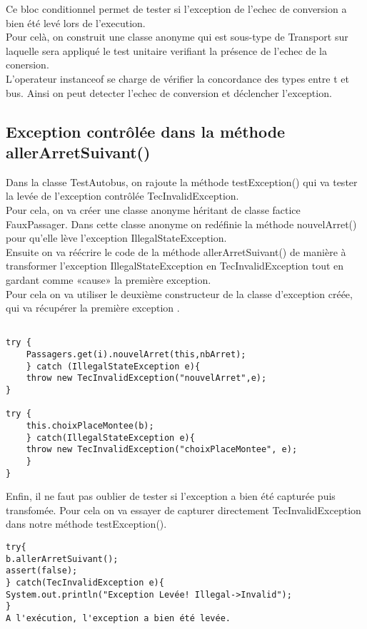 \documentclass[12pt,a4paper]{article}
\begin{document}
Ce bloc conditionnel permet de tester si l'exception de l'echec de conversion a bien été levé lors de l'execution.\\
Pour celà, on construit une classe anonyme qui est sous-type de Transport sur laquelle sera appliqué le test unitaire verifiant la présence de l'echec de la conersion.\\
L'operateur instanceof se charge de vérifier la concordance des types entre t et bus. Ainsi on peut detecter l'echec de conversion et déclencher l'exception.


\subsection{Exception contrôlée dans la méthode allerArretSuivant()} 

Dans la classe TestAutobus, on rajoute la méthode testException() qui va tester la levée de l’exception contrôlée TecInvalidException. \\
Pour cela, on va créer une classe anonyme héritant de classe factice FauxPassager. Dans cette classe anonyme on redéfinie la méthode nouvelArret() pour qu'elle lève l'exception IllegalStateException.\\
Ensuite on va réécrire le code de la méthode allerArretSuivant() de manière à transformer l’exception IllegalStateException en TecInvalidException tout en gardant comme «cause» la première exception.\\
Pour cela on va utiliser le deuxième constructeur de la classe d'exception créée, qui va récupérer la première exception .\\

\begin{verbatim}

try {
	Passagers.get(i).nouvelArret(this,nbArret);
	} catch (IllegalStateException e){
	throw new TecInvalidException("nouvelArret",e);
}

try {
	this.choixPlaceMontee(b);
	} catch(IllegalStateException e){
	throw new TecInvalidException("choixPlaceMontee", e);
	}
}
\end{verbatim}

Enfin, il ne faut pas oublier de tester si l'exception a bien été capturée puis transfomée. Pour cela on va essayer de capturer directement TecInvalidException dans notre méthode testException().

\begin{verbatim}
try{
b.allerArretSuivant();
assert(false);
} catch(TecInvalidException e){
System.out.println("Exception Levée! Illegal->Invalid");
}
A l'exécution, l'exception a bien été levée.
\end{verbatim}
\end{document}
